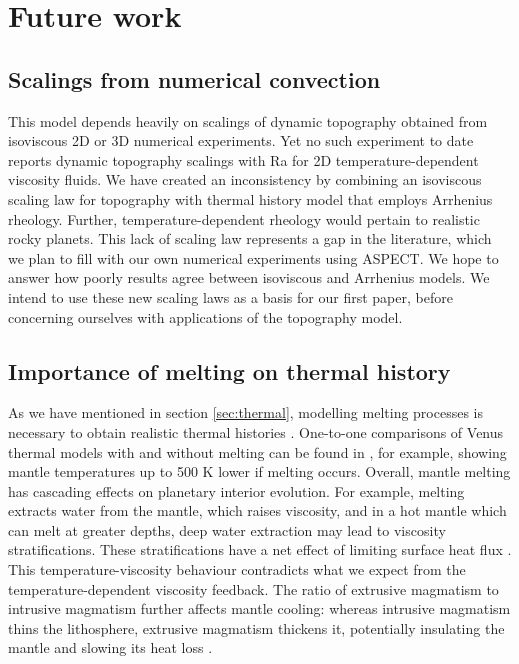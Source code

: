 \section{Future work}

\subsection{Scalings from numerical convection}

This model depends heavily on scalings of dynamic topography obtained from isoviscous 2D or 3D numerical experiments. Yet no such experiment to date reports dynamic topography scalings with Ra for 2D temperature-dependent viscosity fluids. We have created an inconsistency by combining an isoviscous scaling law for topography with thermal history model that employs Arrhenius rheology. Further, temperature-dependent rheology would pertain to realistic rocky planets. This lack of scaling law represents a gap in the literature, which we plan to fill with our own numerical experiments using ASPECT. We hope to answer how poorly results agree between isoviscous and Arrhenius models. We intend to use these new scaling laws as a basis for our first paper, before concerning ourselves with applications of the topography model.

\subsection{Importance of melting on thermal history}\label{sec:melting}

As we have mentioned in section \ref{sec:thermal}, modelling melting processes is necessary to obtain realistic thermal histories \citep{Nakagawa2012}. %
One-to-one comparisons of Venus thermal models with and without melting can be found in \citet{Driscoll2014}, for example, showing mantle temperatures up to 500 K lower if melting occurs. Overall, mantle melting has cascading effects on planetary interior evolution. For example, melting extracts water from the mantle, which raises viscosity, and in a hot mantle which can melt at greater depths, deep water extraction may lead to viscosity stratifications. These stratifications have a net effect of limiting surface heat flux \citep{Korenaga2009}. This temperature-viscosity behaviour contradicts what we expect from the temperature-dependent viscosity feedback. The ratio of extrusive magmatism to intrusive magmatism further affects mantle cooling: whereas intrusive magmatism thins the lithosphere, extrusive magmatism thickens it, potentially insulating the mantle and slowing its heat loss \citep{Lourenco2018}. 

